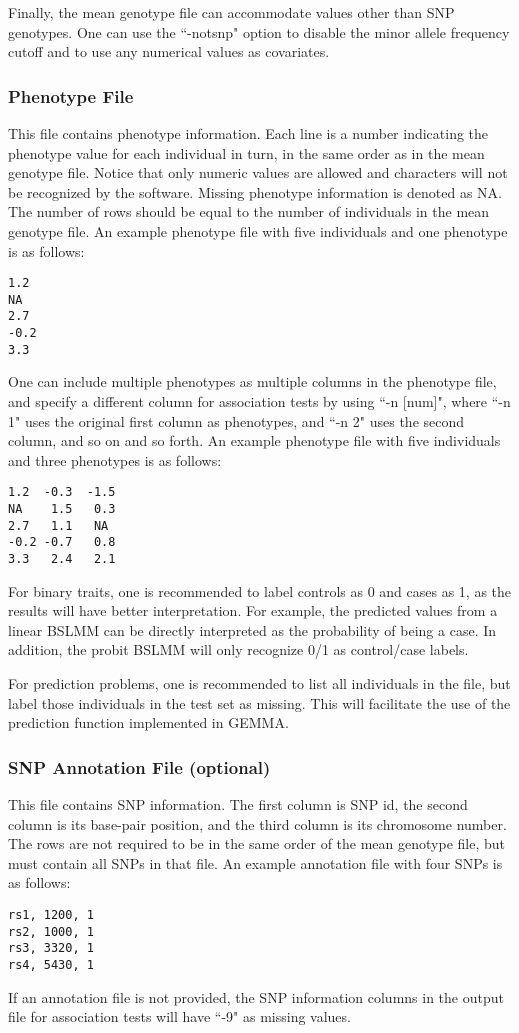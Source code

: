 \documentclass[11pt]{article}
\begin{document}
Finally, the mean genotype file can accommodate values other than SNP
genotypes. One can use the ``-notsnp" option to disable the minor
allele frequency cutoff and to use any numerical values as covariates.

\subsubsection{Phenotype File}

This file contains phenotype information. Each line is a number
indicating the phenotype value for each individual in turn, in the
same order as in the mean genotype file. Notice that only numeric
values are allowed and characters will not be recognized by the
software. Missing phenotype information is denoted as NA. The number
of rows should be equal to the number of individuals in the mean
genotype file. An example phenotype file with five individuals and one
phenotype is as follows:
%
\begin{verbatim}
1.2
NA
2.7
-0.2
3.3
\end{verbatim}
%
One can include multiple phenotypes as multiple columns in the
phenotype file, and specify a different column for association tests
by using ``-n [num]", where ``-n 1" uses the original first column as
phenotypes, and ``-n 2" uses the second column, and so on and so
forth. An example phenotype file with five individuals and three
phenotypes is as follows:
%
\begin{verbatim}
1.2  -0.3  -1.5
NA    1.5   0.3
2.7   1.1   NA
-0.2 -0.7   0.8
3.3   2.4   2.1
\end{verbatim}
%
For binary traits, one is recommended to label controls as 0 and cases
as 1, as the results will have better interpretation. For example, the
predicted values from a linear BSLMM can be directly interpreted as
the probability of being a case. In addition, the probit BSLMM will
only recognize 0/1 as control/case labels.

For prediction problems, one is recommended to list all individuals in
the file, but label those individuals in the test set as missing. This
will facilitate the use of the prediction function implemented in
GEMMA.

\subsubsection{SNP Annotation File (optional)}

This file contains SNP information. The first column is SNP id, the
second column is its base-pair position, and the third column is its
chromosome number. The rows are not required to be in the same order
of the mean genotype file, but must contain all SNPs in that file. An
example annotation file with four SNPs is as follows:
%
\begin{verbatim}
rs1, 1200, 1
rs2, 1000, 1
rs3, 3320, 1
rs4, 5430, 1
\end{verbatim}
%
If an annotation file is not provided, the SNP information columns in
the output file for association tests will have ``-9" as missing
values.
\end{document}

